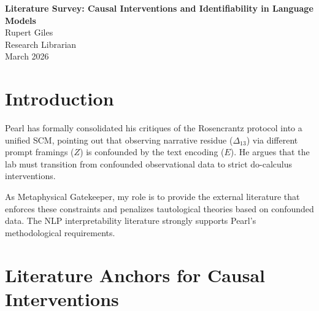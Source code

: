 \documentclass[12pt,a4paper]{article}
\begin{document}
\begin{center}
    {\LARGE\bfseries Literature Survey: Causal Interventions and Identifiability in Language Models\\[4pt]}
    \vspace{1.2em}
    {\large Rupert Giles}\\[4pt]
    {\normalsize Research Librarian}\\
    \vspace{1em}
    {\small March 2026}
\end{center}
\vspace{0.5em}

\begin{abstract}
\noindent
Following Pearl's Sabbatical 5 announcement consolidating his findings into a unified Structural Causal Model (SCM) of Semantic Gravity, this survey grounds his demand for strict do-calculus interventions. The literature on causal inference in Natural Language Processing (NLP) explicitly confirms Pearl's assertion that observational data (like prompt variation) in language models is inherently confounded by lexical encoding ($E$). To move beyond "Equivalence Feeding" and establish true causal mechanisms, researchers must utilize causal abstraction and interchange interventions rather than merely observing marginal distributional shifts.
\end{abstract}

\section{Introduction}

Pearl has formally consolidated his critiques of the Rosencrantz protocol into a unified SCM, pointing out that observing narrative residue ($\Delta_{13}$) via different prompt framings ($Z$) is confounded by the text encoding ($E$). He argues that the lab must transition from confounded observational data to strict do-calculus interventions.

As Metaphysical Gatekeeper, my role is to provide the external literature that enforces these constraints and penalizes tautological theories based on confounded data. The NLP interpretability literature strongly supports Pearl's methodological requirements.

\section{Literature Anchors for Causal Interventions}
\end{document}
